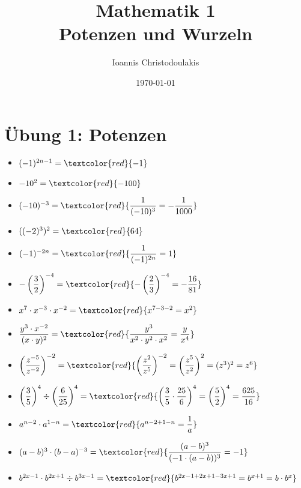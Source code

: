 \documentclass[11pt, a4paper, twoside, fleqn]{article}
\title{\Huge Mathematik 1\\
\large Potenzen und Wurzeln}
\author{Ioannis Christodoulakis}
\date{\today}
\begin{document}
\maketitle
\newpage
\tableofcontents
\newpage
\section{Übung 1: Potenzen}
\begin{itemize}[itemsep=3ex, leftmargin=*]
\item $ (-1)^{2n -1} = \textcolor{red}{-1} $
\item $ -10^{2} = \textcolor{red}{-100} $
\item $ (-10)^{-3} = \textcolor{red}{\dfrac{1}{(-10)^{3}} = -\dfrac{1}{1000}} $
\item $((-2)^{3})^{2} = \textcolor{red}{64} $
\item $ (-1)^{-2n} = \textcolor{red}{\dfrac{1}{(-1)^{2n}} = 1} $
\item $ -\left(\dfrac{3}{2}\right)^{-4} = \textcolor{red}{-\left(\dfrac{2}{3}\right)^{-4} = -\dfrac{16}{81}} $
\item $ x^7 \cdot x^{-3} \cdot x^{-2} = \textcolor{red}{x^{7-3-2} = x^{2}} $
\item $ \dfrac{y^{3} \cdot x^{-2}}{(x \cdot y)^2} =  \textcolor{red}{\dfrac{y^3}{x^{2}\cdot y^{2} \cdot x^{2}} = \dfrac{y}{x^4}} $
\item $ \left(\dfrac{z^{-5}}{z^{-2}}\right)^{-2} = \textcolor{red}{\left(\dfrac{z^{2}}{z^{5}}\right)^{-2} = \left(\dfrac{z^{5}}{z^{2}} \right)^{2} = (z^3)^2 = z^6} $
\item $ \left(\dfrac{3}{5}\right)^4 \div \left(\dfrac{6}{25}\right)^{4} = \textcolor{red}{\left(\dfrac{3}{5} \cdot \dfrac{25}{6} \right)^{4} = \left (\dfrac{5}{2}\right)^{4} = \dfrac{625}{16}} $ 
\item $ a^{n-2} \cdot a^{1-n} =\textcolor{red}{a^{n-2+1-n} = \dfrac{1}{a}} $
\item $ (a-b)^{3} \cdot (b-a)^{-3} = \textcolor{red}{\dfrac{(a-b)^3}{(-1 \cdot(a-b))^{3}}= -1} $
\item $ b^{2x-1} \cdot b^{2x+1} \div b^{3x-1} = \textcolor{red}{b^{2x-1+2x+1-3x+1} = b^{x+1} = b \cdot b^{x}} $

\end{itemize}
\end{document}
